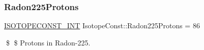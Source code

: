 \subsubsection{\texorpdfstring{Radon225\+Protons}{Radon225Protons}}
{\footnotesize\ttfamily \mbox{\hyperlink{group___isotope_const-_macros_ga5f18360b3e99483a35c32d789e62621c}{I\+S\+O\+T\+O\+P\+E\+C\+O\+N\+S\+T\+\_\+\+I\+NT}} Isotope\+Const\+::\+Radon225\+Protons = 86}

\$ \$ Protons in Radon-\/225. 